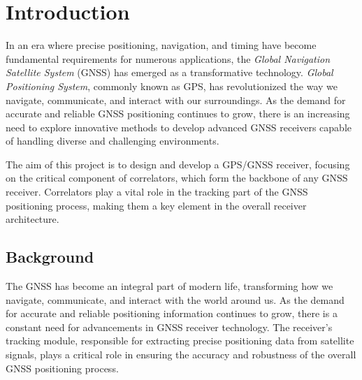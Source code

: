 \chapter{Introduction}
In an era where precise positioning, navigation, and timing have become fundamental requirements for numerous applications, the \textit{Global Navigation Satellite System} (GNSS) has emerged as a transformative technology. \textit{Global Positioning System}, commonly known as GPS, has revolutionized the way we navigate, communicate, and interact with our surroundings. As the demand for accurate and reliable GNSS positioning continues to grow, there is an increasing need to explore innovative methods to develop advanced GNSS receivers capable of handling diverse and challenging environments.

The aim of this project is to design and develop a GPS/GNSS receiver, focusing on the critical component of correlators, which form the backbone of any GNSS receiver. Correlators play a vital role in the tracking part of the GNSS positioning process, making them a key element in the overall receiver architecture.

\section{Background}
The GNSS has become an integral part of modern life, transforming how we navigate, communicate, and interact with the world around us. As the demand for accurate and reliable positioning information continues to grow, there is a constant need for advancements in GNSS receiver technology. The receiver's tracking module, responsible for extracting precise positioning data from satellite signals, plays a critical role in ensuring the accuracy and robustness of the overall GNSS positioning process.

